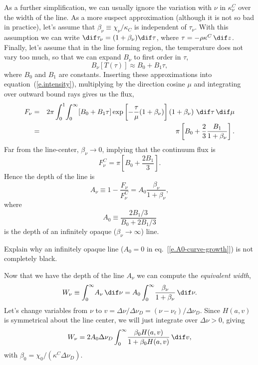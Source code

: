 As a further simplification, we can usually ignore the variation with $\nu$ in $\kappa_{\nu}^{C}$ over the width of the line. As a more suspect approximation (although it is not so bad in practice), let's assume that $\beta_{\nu} \equiv \chi_{\nu}/\kappa_{C}$ is independent of $\tau_{\nu}$. With this assumption we can write $\dif\tau_{\nu} = (1+\beta_{\nu})\dif\tau$, where $\tau = -\rho\kappa^{C}\,\dif z$. Finally, let's assume that in the line forming region, the temperature does not vary too much, so that we can expand $B_{\nu}$ to first order in $\tau$,
\[ B_{\nu}[T(\tau)] \approx B_{0} + B_{1}\tau, \]
where $B_{0}$ and $B_{1}$ are constants.
Inserting these approximations into equation~(\ref{e.intensity}), multiplying by the direction cosine $\mu$ and integrating over outward bound rays gives us the flux,
\begin{eqnarray}\label{e.flux}
F_{\nu} &=& 2\pi\int_{0}^{1}\!\int_{0}^{\infty}\!\left[B_{0}+B_{1}\tau\right]\exp\left[-\frac{\tau}{\mu}(1+\beta_{\nu})\right] \left(1+\beta_{\nu}\right) \,\dif\tau\,\dif\mu\nonumber\\
 &=& \pi\left[ B_{0} + \frac{2}{3}\frac{B_{1}}{1+\beta_{\nu}}\right].
\end{eqnarray}
Far from the line-center, $\beta_{\nu}\to 0$, implying that the continuum flux is
\[ F_{\nu}^{C} = \pi\left[B_{0} + \frac{2B_{1}}{3}\right]. \]
Hence the depth of the line is
\begin{equation}\label{e.line-depth}
A_{\nu} \equiv 1 - \frac{F_{\nu}}{F_{\nu}^{C}} = A_{0}\frac{\beta_{\nu}}{1+\beta_{\nu}},
\end{equation}
where
\begin{equation}\label{e.A0-curve-growth}
 A_{0} \equiv \frac{2B_{1}/3}{B_{0} + 2B_{1}/3}
 \end{equation}
is the depth of an infinitely opaque ($\beta_{\nu}\to\infty$) line. 

\begin{exercisebox}
Explain why an infinitely opaque line ($A_{0}=0$ in eq.~[\ref{e.A0-curve-growth}]) is not completely black.
\end{exercisebox}

Now that we have the depth of the line $A_{\nu}$ we can compute the \emph{equivalent width},
\begin{equation}\label{e.W}
W_{\nu} \equiv \int_{0}^{\infty}\! A_{\nu}\,\dif\nu = A_{0}\int_{0}^{\infty}\!\frac{\beta_{\nu}}{1+\beta_{\nu}}\,\dif\nu.
\end{equation}
Let's change variables from $\nu$ to $v = \Delta\nu/\Delta\nu_{D} = (\nu-\nu_{\ell})/\Delta\nu_{D}$.  Since $H(a,v)$ is symmetrical about the line center, we will just integrate over $\Delta\nu >0$, giving
\begin{equation}\label{e.Wv}
 W_{\nu} = 2A_{0}\Delta\nu_{D}\int_{0}^{\infty}\!\frac{\beta_{0}H(a,v)}{1+\beta_{0}H(a,v)}\,\dif v,
 \end{equation}
with $\beta_{0} = \chi_{0}/(\kappa^{C}\Delta\nu_{D})$.

